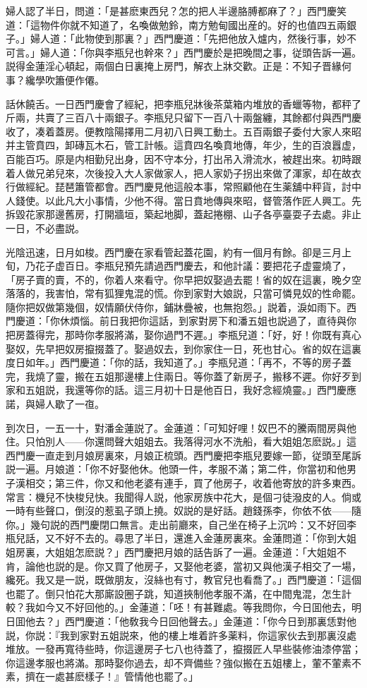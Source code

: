 婦人認了半日，問道：「是甚麽東西兒？怎的把人半邊胳膊都麻了？」西門慶笑道：「這物件你就不知道了，名喚做勉鈴，南方勉甸國出産的。好的也值四五兩銀子。」婦人道：「此物使到那裏？」西門慶道：「先把他放入爐内，然後行事，妙不可言。」婦人道：「你與李瓶兒也幹來？」西門慶於是把晚間之事，従頭告訴一遍。説得金蓮淫心頓起，兩個白日裏掩上房門，解衣上牀交歡。正是：不知子晋緣何事？纔學吹簫便作僊。

話休饒舌。一日西門慶會了經紀，把李瓶兒牀後茶葉箱内堆放的香蠟等物，都秤了斤兩，共賣了三百八十兩銀子。李瓶兒只留下一百八十兩盤纏，其餘都付與西門慶收了，凑着蓋房。便教陰陽擇用二月初八日興工動土。五百兩銀子委付大家人來昭并主管賁四，卸磚瓦木石，管工計帳。這賁四名喚賁地傳，年少，生的百浪囂虚，百能百巧。原是内相勤兒出身，因不守本分，打出吊入滑流水，被趕出來。初時跟着人做兄弟兒來，次後投入大人家做家人，把人家奶子拐出來做了渾家，却在故衣行做經紀。琵琶簫管都會。西門慶見他這般本事，常照顧他在生薬舖中秤貨，討中人錢使。以此凡大小事情，少他不得。當日賁地傳與來昭，督管落作匠人興工。先拆毀花家那邊舊房，打開牆垣，築起地脚，蓋起捲棚、山子各亭臺耍子去處。非止一日，不必盡説。

光陰迅速，日月如梭。西門慶在家看管起蓋花園，約有一個月有餘。卻是三月上旬，乃花子虚百日。李瓶兒預先請過西門慶去，和他計議：要把花子虚靈燒了，「房子賣的賣，不的，你着人來看守。你早把奴娶過去罷！省的奴在這裏，晚夕空落落的，我害怕，常有狐狸鬼混的慌。你到家對大娘説，只當可憐見奴的性命罷。隨你把奴做第幾個，奴情願伏侍你，鋪牀疊被，也無抱怨。」説着，淚如雨下。西門慶道：「你休煩惱。前日我把你這話，到家對房下和潘五姐也説過了，直待與你把房蓋得完，那時你孝服將滿，娶你過門不遲。」李瓶兒道：「好，好！你既有真心娶奴，先早把奴房攛掇蓋了。娶過奴去，到你家住一日，死也甘心。省的奴在這裏度日如年。」西門慶道：「你的話，我知道了。」李瓶兒道：「再不，不等的房子蓋完，我燒了靈，搬在五姐那邊樓上住兩日。等你蓋了新房子，搬移不遲。你好歹到家和五姐説，我還等你的話。這三月初十日是他百日，我好念經燒靈。」西門慶應諾，與婦人歇了一亱。

到次日，一五一十，對潘金蓮説了。金蓮道：「可知好哩！奴巴不的騰兩間房與他住。只怕別人——你還問聲大姐姐去。我落得河水不洗船，看大姐姐怎麽説。」這西門慶一直走到月娘房裏來，月娘正梳頭。西門慶把李瓶兒要嫁一節，従頭至尾訴説一遍。月娘道：「你不好娶他休。他頭一件，孝服不滿；第二件，你當初和他男子漢相交；第三件，你又和他老婆有連手，買了他房子，收着他寄放的許多東西。常言：機兒不快梭兒快。我聞得人説，他家房族中花大，是個刁徒潑皮的人。倘或一時有些聲口，倒沒的惹虱子頭上撓。奴説的是好話。趙錢孫李，你依不依——隨你。」幾句説的西門慶閉口無言。走出前廳來，自己坐在椅子上沉吟：又不好回李瓶兒話，又不好不去的。尋思了半日，還進入金蓮房裏來。金蓮問道：「你到大姐姐房裏，大姐姐怎麽説？」西門慶把月娘的話告訴了一遍。金蓮道：「大姐姐不肯，論他也説的是。你又買了他房子，又娶他老婆，當初又與他漢子相交了一場，纔死。我又是一説，既做朋友，沒絲也有寸，教官兒也看喬了。」西門慶道：「這個也罷了。倒只怕花大那廝設圈子跳，知道挾制他孝服不滿，在中間鬼混，怎生計較？我如今又不好回他的。」金蓮道：「呸！有甚難處。等我問你，今日囬他去，明日囬他去？」西門慶道：「他敎我今日回他聲去。」金蓮道：「你今日到那裏恁對他説，你説：『我到家對五姐説來，他的樓上堆着許多薬料，你這家伙去到那裏沒處堆放。一發再寬待些時，你這邊房子七八也待蓋了，攛掇匠人早些裝修油漆停當；你這邊孝服也將滿。那時娶你過去，却不齊備些？強似搬在五姐樓上，葷不葷素不素，擠在一處甚麽樣子！』管情他也罷了。」

